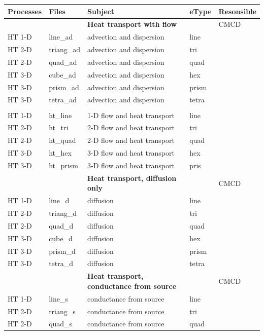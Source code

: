 \begin{center}
\begin{tabular*}{12.7cm}{|p{1.5cm}|p{1.8cm}|p{4.78cm}|p{1cm}|p{1.5cm}|} \hline
Processes & Files & Subject                & eType & Resonsible \\
\hline \hline
           &             & \textbf{Heat transport with flow} & & CMCD\\
HT  1-D    & line\_ad & advection and dispersion & line &  \\
HT  2-D    & triang\_ad & advection and dispersion & tri &  \\
HT  2-D    & quad\_ad & advection and dispersion & quad&  \\
HT  3-D    & cube\_ad & advection and dispersion & hex &  \\
HT  3-D    & prism\_ad & advection and dispersion & prism & \\
HT  3-D    & tetra\_ad & advection and dispersion & tetra & \\
& & & & \\
HT 1-D    & ht\_line&1-D flow and heat transport & line & \\
HT 2-D    & ht\_tri &2-D flow and heat transport & tri & \\
HT 2-D    & ht\_quad &2-D flow and heat transport & quad & \\
HT 3-D    & ht\_hex &3-D flow and heat transport & hex & \\
HT 3-D    & ht\_prism &3-D flow and heat transport & pris & \\
\hline
           &             & \textbf{Heat transport, diffusion only} & & CMCD\\
HT  1-D    & line\_d & diffusion & line &\\
HT  2-D    & triang\_d & diffusion & tri &\\
HT  2-D    & quad\_d & diffusion & quad &\\
HT  3-D    & cube\_d & diffusion & hex &\\
HT  3-D    & prism\_d & diffusion & prism &\\
HT  3-D    & tetra\_d & diffusion & tetra &\\
\hline
           &             & \textbf{Heat transport, conductance from source} & & CMCD\\
HT  1-D    & line\_s & conductance from source & line &\\
HT  2-D    & triang\_s & conductance from source & tri &\\
HT  2-D    & quad\_s & conductance from source & quad &\\

\end{tabular*}
\end{center}
